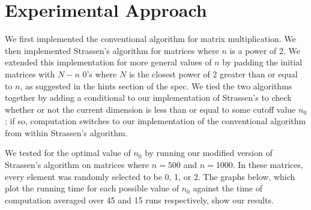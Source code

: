\documentclass[solution, letterpaper]{cs121}
\begin{document}
\section*{Experimental Approach}

\hspace{4mm}We first implemented the conventional algorithm for matrix multiplication. We then implemented Strassen's algorithm for matrices where $n$ is a power of 2. We extended this implementation for more general values of $n$ by padding the initial matrices with $N - n$  0's where $N$ is the closest power of 2 greater than or equal to $n$, as suggested in the hints section of the spec. We tied the two algorithms together by adding a conditional to our implementation of Strassen's to check whether or not the current dimension is less than or equal to some cutoff value $n_0$; if so, computation switches to our implementation of the conventional algorithm from within Strassen's algorithm. 

We tested for the optimal value of $n_0$ by running our modified version of Strassen's algorithm on matrices where $n=500$ and $n=1000$. In these matrices, every element was randomly selected to be 0, 1, or 2. The graphs below, which plot the running time for each possible value of $n_0$ against the time of computation averaged over 45 and 15 runs respectively, show our results. 
\end{document}
